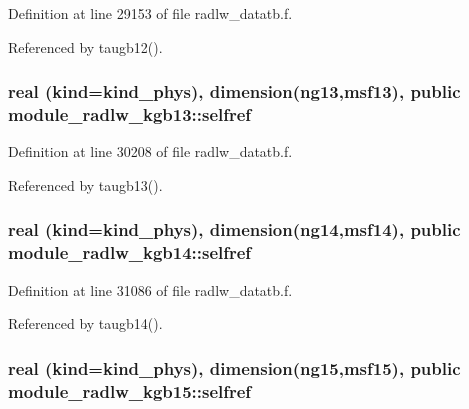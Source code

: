 Definition at line 29153 of file radlw\+\_\+datatb.\+f.



Referenced by taugb12().

\subsubsection[{\texorpdfstring{selfref}{selfref}}]{\setlength{\rightskip}{0pt plus 5cm}real (kind=kind\+\_\+phys), dimension(ng13,msf13), public module\+\_\+radlw\+\_\+kgb13\+::selfref}\hypertarget{group__module__radlw__main_gac8f58bba6aa4b72ffd01f78e60d0831f}{}\label{group__module__radlw__main_gac8f58bba6aa4b72ffd01f78e60d0831f}


Definition at line 30208 of file radlw\+\_\+datatb.\+f.



Referenced by taugb13().

\subsubsection[{\texorpdfstring{selfref}{selfref}}]{\setlength{\rightskip}{0pt plus 5cm}real (kind=kind\+\_\+phys), dimension(ng14,msf14), public module\+\_\+radlw\+\_\+kgb14\+::selfref}\hypertarget{group__module__radlw__main_ga0e390a41b1c9e2ece765d65774060bca}{}\label{group__module__radlw__main_ga0e390a41b1c9e2ece765d65774060bca}


Definition at line 31086 of file radlw\+\_\+datatb.\+f.



Referenced by taugb14().

\subsubsection[{\texorpdfstring{selfref}{selfref}}]{\setlength{\rightskip}{0pt plus 5cm}real (kind=kind\+\_\+phys), dimension(ng15,msf15), public module\+\_\+radlw\+\_\+kgb15\+::selfref}\hypertarget{group__module__radlw__main_ga1d14e9b2e607f2022d84c6fc0cd27c4e}{}\label{group__module__radlw__main_ga1d14e9b2e607f2022d84c6fc0cd27c4e}


